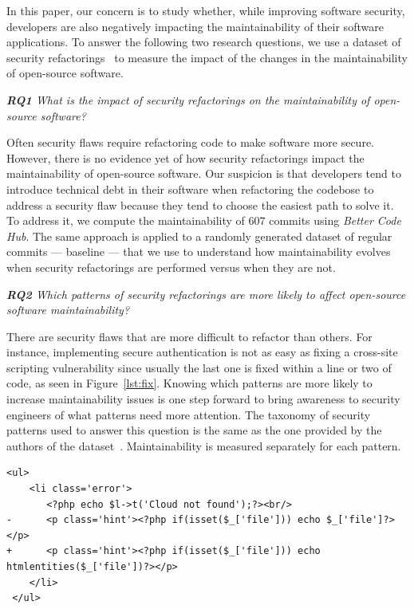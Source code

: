 \documentclass[10pt,conference]{IEEEtran}
\newcounter{lstannotation}
\begin{document}
In this paper, our concern is to study whether, while improving software
security, developers are also negatively impacting the maintainability
of their software applications. To answer the following two
research questions, we use a dataset of security refactorings~\cite{Reis:2017:IJSSE} to measure the
impact of the changes in the maintainability of open-source software.

\begin{framed}
\textit{\textbf{RQ1} What is the impact of security refactorings on the
maintainability of open-source software?}
\end{framed}

Often security flaws require refactoring code to make software more secure.
However, there is no evidence yet of how security refactorings impact the
maintainability of open-source software. Our suspicion is that developers tend
to introduce technical debt in their software when refactoring the codebose to
address a security flaw because they tend to choose the easiest path to solve
it. To address it, we compute the maintainability of $607$ commits using
\emph{Better Code Hub}. The same approach is applied to a randomly generated
dataset of regular commits --- baseline --- that we use to understand how
maintainability evolves when security refactorings are performed versus when
they are not.

\begin{framed}
\textit{\textbf{RQ2} Which patterns of security refactorings are more likely to
affect open-source software maintainability?}
\end{framed}

There are security flaws that are more difficult to refactor than others. For
instance, implementing secure authentication is not as easy as fixing a cross-site scripting vulnerability
since usually the last one is fixed within a line or two of code, as seen in Figure~\ref{lst:fix}. 
Knowing which patterns are more likely to increase maintainability
issues is one step forward to bring awareness to security engineers of what
patterns need more attention. The taxonomy of security patterns used to answer
this question is the same as the one provided by the authors of the dataset~\cite{Reis:2017:IJSSE}.
Maintainability is measured separately for each pattern.

\setcounter{lstannotation}{0}
\begin{lstlisting}[style={PHPStyle}, caption={Fix provided by \texttt{nextcloud/server} developers to a \\Cross-Site Scripting vulnerability},label={lst:fix}]
 <ul>
    <li class='error'>
       <?php echo $l->t('Cloud not found');?><br/>
-      <p class='hint'><?php if(isset($_['file'])) echo $_['file']?></p>
+      <p class='hint'><?php if(isset($_['file'])) echo htmlentities($_['file'])?></p>
    </li>
 </ul>

\end{lstlisting}
%
\end{document}
